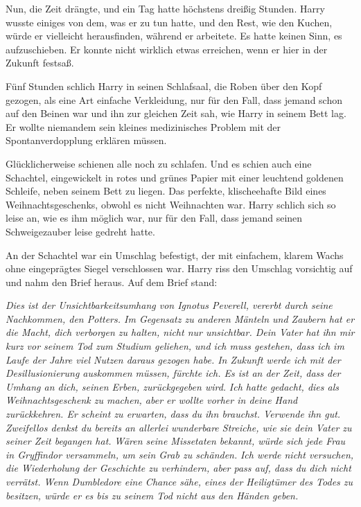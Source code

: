 Nun, die Zeit drängte, und ein Tag hatte höchstens dreißig Stunden. Harry wusste
einiges von dem, was er zu tun hatte, und den Rest, wie den Kuchen, würde er
vielleicht herausfinden, während er arbeitete. Es hatte keinen Sinn, es
aufzuschieben. Er konnte nicht wirklich etwas erreichen, wenn er hier in der
Zukunft festsaß.

Fünf Stunden schlich Harry in seinen Schlafsaal, die Roben über den Kopf
gezogen, als eine Art einfache Verkleidung, nur für den Fall, dass jemand schon
auf den Beinen war und ihn zur gleichen Zeit sah, wie Harry in seinem Bett lag.
Er wollte niemandem sein kleines medizinisches Problem mit der
Spontanverdopplung erklären müssen.

Glücklicherweise schienen alle noch zu schlafen. Und es schien auch eine
Schachtel, eingewickelt in rotes und grünes Papier mit einer leuchtend goldenen
Schleife, neben seinem Bett zu liegen. Das perfekte, klischeehafte Bild eines
Weihnachtsgeschenks, obwohl es nicht Weihnachten war. Harry schlich sich so
leise an, wie es ihm möglich war, nur für den Fall, dass jemand seinen
Schweigezauber leise gedreht hatte.

An der Schachtel war ein Umschlag befestigt, der mit einfachem, klarem Wachs
ohne eingeprägtes Siegel verschlossen war. Harry riss den Umschlag vorsichtig
auf und nahm den Brief heraus. Auf dem Brief stand:

\emph{Dies ist der Unsichtbarkeitsumhang von Ignotus Peverell, vererbt durch
seine Nachkommen, den Potters. Im Gegensatz zu anderen Mänteln und Zaubern hat
er die Macht, dich verborgen zu halten, nicht nur unsichtbar. Dein Vater hat ihn
mir kurz vor seinem Tod zum Studium geliehen, und ich muss gestehen, dass ich im
Laufe der Jahre viel Nutzen daraus gezogen habe. In Zukunft werde ich mit der
Desillusionierung auskommen müssen, fürchte ich. Es ist an der Zeit, dass der
Umhang an dich, seinen Erben, zurückgegeben wird.} \emph{Ich hatte gedacht,
dies als Weihnachtsgeschenk zu machen, aber er wollte vorher in deine Hand
zurückkehren. Er scheint zu erwarten, dass du ihn brauchst. Verwende ihn gut.
Zweifellos denkst du bereits an allerlei wunderbare Streiche, wie sie dein Vater
zu seiner Zeit begangen hat.} \emph{Wären seine Missetaten bekannt, würde sich
jede Frau in Gryffindor versammeln, um sein Grab zu schänden.} \emph{Ich werde
nicht versuchen, die Wiederholung der Geschichte zu verhindern, aber pass auf,
dass du dich nicht verrätst. Wenn Dumbledore eine Chance sähe, eines der
Heiligtümer des Todes zu besitzen, würde er es bis zu seinem Tod nicht aus den
Händen geben.}

